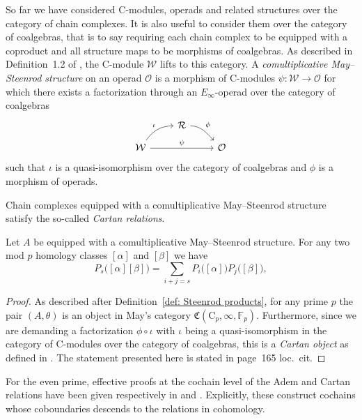 So far we have considered $\mathrm{C}$-modules, operads and related structures over the category of chain complexes.
It is also useful to consider them over the category of coalgebras, that is to say requiring each chain complex to be equipped with a coproduct and all structure maps to be morphisms of coalgebras.
As described in Definition~1.2 of \cite{may1970general}, the $\mathrm{C}$-module $\mathcal W$ lifts to this category.
A \textit{comultiplicative May--Steenrod structure} on an operad $\mathcal O$ is a morphism of $\mathrm{C}$-modules $\psi \colon \mathcal W \to \mathcal O$ for which there exists a factorization through an $E_\infty$-operad over the category of coalgebras
\begin{equation*}
\begin{tikzcd}[column sep = normal, row sep = small]
& \mathcal R \arrow[dr, "\phi", out=0] & \\
\mathcal W \arrow[ur, "\iota", out=55, in=180] \arrow[rr, "\psi"] & & \mathcal O
\end{tikzcd}
\end{equation*}
such that $\iota$ is a quasi-isomorphism over the category of coalgebras and $\phi$ is a morphism of operads.

Chain complexes equipped with a comultiplicative May--Steenrod structure satisfy the so-called \textit{Cartan relations}.

\begin{lemma}
	Let $A$ be equipped with a comultiplicative May--Steenrod structure.
	For any two mod $p$ homology classes $[\alpha]$ and $[\beta]$ we have
	\begin{equation*}
	P_s\big([\alpha] [\beta]\big) = \sum_{i+j=s} P_i\big( [\alpha] \big) P_j\big( [\beta] \big),
	\end{equation*}
\end{lemma}

\begin{proof}
	As described after Definition~\ref{def: Steenrod products}, for any prime $p$ the pair $(A, \theta)$ is an object in May's category $\mathfrak{C}(\mathrm C_p, \infty, \mathbb{F}_p)$.
	Furthermore, since we are demanding a factorization $\phi \circ \iota$ with $\iota$ being a quasi-isomorphism in the category of $\mathrm{C}$-modules over the category of coalgebras, this is a \textit{Cartan object} as defined in \cite[p.161]{may1970general}.
	The statement presented here is stated in page~165 loc.~cit.
\end{proof}

For the even prime, effective proofs at the cochain level of the Adem and Cartan relations have been given respectively in \cite{medina2021adem} and \cite{medina2020cartan}.
Explicitly, these construct cochains whose coboundaries descends to the relations in cohomology.